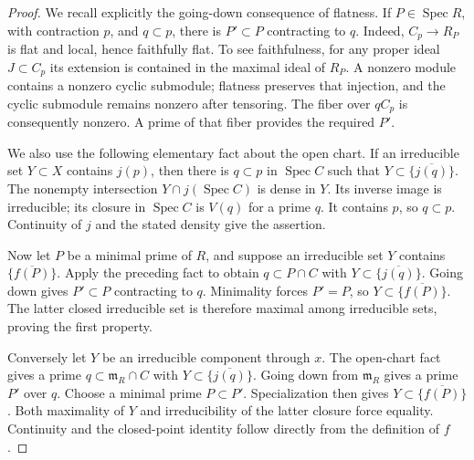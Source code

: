 \documentclass[11pt,a4paper]{article}
\numberwithin{equation}{section}
\theoremstyle{remark}\newtheorem{remark}[theorem]{Remark}
\begin{document}
\begin{proof}
We recall explicitly the going-down consequence of flatness.
If \(P\in\operatorname{Spec}R\), with contraction \(p\),
and \(q\subset p\), there is \(P'\subset P\) contracting to
\(q\).  Indeed, \(C_p\to R_P\) is flat and local, hence
faithfully flat.  To see faithfulness, for any proper ideal
\(J\subset C_p\) its extension is contained in the maximal
ideal of \(R_P\).  A nonzero module contains a nonzero cyclic
submodule; flatness preserves that injection, and the cyclic
submodule remains nonzero after tensoring.  The fiber over
\(qC_p\) is consequently nonzero.  A prime of that fiber
provides the required \(P'\).

We also use the following elementary fact about the open chart.
If an irreducible set \(Y\subset X\) contains \(j(p)\), then
there is \(q\subset p\) in \(\operatorname{Spec}C\) such that
\(Y\subset\overline{\{j(q)\}}\).
The nonempty intersection \(Y\cap j(\operatorname{Spec}C)\)
is dense in \(Y\).  Its inverse image is irreducible; its
closure in \(\operatorname{Spec}C\) is \(V(q)\) for a prime
\(q\).  It contains \(p\), so \(q\subset p\).
Continuity of \(j\) and the stated density give the assertion.

Now let \(P\) be a minimal prime of \(R\), and suppose an
irreducible set \(Y\) contains \(\overline{\{f(P)\}}\).
Apply the preceding fact to obtain \(q\subset P\cap C\)
with \(Y\subset\overline{\{j(q)\}}\).  Going down gives
\(P'\subset P\) contracting to \(q\).  Minimality forces
\(P'=P\), so \(Y\subset\overline{\{f(P)\}}\).
The latter closed irreducible set is therefore maximal among
irreducible sets, proving the first property.

Conversely let \(Y\) be an irreducible component through \(x\).
The open-chart fact gives a prime
\(q\subset\mathfrak m_R\cap C\) with
\(Y\subset\overline{\{j(q)\}}\).  Going down from
\(\mathfrak m_R\) gives a prime \(P'\) over \(q\).
Choose a minimal prime \(P\subset P'\).
Specialization then gives
\(Y\subset\overline{\{f(P)\}}\).
Both maximality of \(Y\) and irreducibility of the latter
closure force equality.  Continuity and the closed-point
identity follow directly from the definition of \(f\).
\end{proof}

\end{document}

